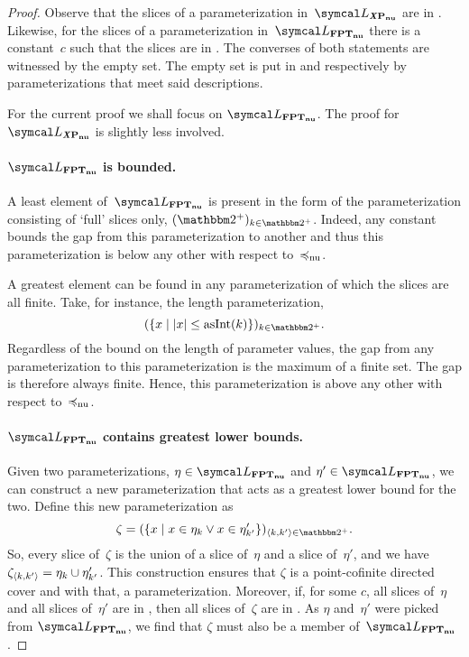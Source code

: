 \begin{proof}
  Observe that the slices of a parameterization in~$\calL_\clXnu{P}$ are in .
  Likewise, for the slices of a parameterization in~$\calL_\clnu{FPT}$ there is a constant~$c$ such that the slices are in .
  The converses of both statements are witnessed by the empty set.
  The empty set is put in  and  respectively by parameterizations that meet said descriptions.

  For the current proof we shall focus on $\calL_\clnu{FPT}$.
  The proof for $\calL_\clXnu{P}$ is slightly less involved.

  \paragraph{$\calL_\clnu{FPT}$ is bounded.}
  A least element of~$\calL_\clnu{FPT}$ is present in the form of the parameterization consisting of `full' slices only, $(\binary^+)_{k \in \binary^+}$.
  Indeed, any constant bounds the gap from this parameterization to another and thus this parameterization is below any other with respect to~$\preccurlyeq_\mathrm{nu}$.

  A greatest element can be found in any parameterization of which the slices are all finite.
  Take, for instance, the length parameterization,
  \begin{equation*}
    (\{x \st \length{x} \le \asNat(k)\})_{k \in \binary^+}.
  \end{equation*}
  Regardless of the bound on the length of parameter values, the gap from any parameterization to this parameterization is the maximum of a finite set.
  The gap is therefore always finite.
  Hence, this parameterization is above any other with respect to~$\preccurlyeq_\mathrm{nu}$.

  \paragraph{$\calL_\clnu{FPT}$ contains greatest lower bounds.}
  Given two parameterizations, $\eta \in \calL_\clnu{FPT}$ and $\eta' \in \calL_\clnu{FPT}$, we can construct a new parameterization that acts as a greatest lower bound for the two.
  Define this new parameterization as
  \begin{equation*}
    \zeta \deq (\{x \st x \in \eta_k \lor x \in \eta'_{k'}\})_{\pair{k}{k'} \in \binary^+}.
  \end{equation*}
  So, every slice of~$\zeta$ is the union of a slice of~$\eta$ and a slice of~$\eta'$, and we have $\zeta_{\langle k, k'\rangle} = \eta_k \cup \eta'_{k'}$.
  This construction ensures that $\zeta$ is a point-cofinite directed cover and with that, a parameterization.
  Moreover, if, for some $c$, all slices of~$\eta$ and all slices of~$\eta'$ are in , then all slices of~$\zeta$ are in .
  As $\eta$ and~$\eta'$ were picked from $\calL_\clnu{FPT}$, we find that $\zeta$ must also be a member of~$\calL_\clnu{FPT}$.


\end{proof}
